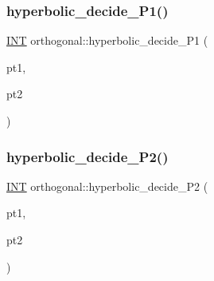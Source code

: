 \mbox{\label{classorthogonal_a5029e837107b4b67481a4a26043f4443}} 
\subsubsection{\texorpdfstring{hyperbolic\+\_\+decide\+\_\+\+P1()}{hyperbolic\_decide\_P1()}}
{\footnotesize\ttfamily \mbox{\hyperlink{galois_8h_a09fddde158a3a20bd2dcadb609de11dc}{I\+NT}} orthogonal\+::hyperbolic\+\_\+decide\+\_\+\+P1 (\begin{DoxyParamCaption}\item[{\mbox{\hyperlink{galois_8h_a09fddde158a3a20bd2dcadb609de11dc}{I\+NT}}}]{pt1,  }\item[{\mbox{\hyperlink{galois_8h_a09fddde158a3a20bd2dcadb609de11dc}{I\+NT}}}]{pt2 }\end{DoxyParamCaption})}

\mbox{\label{classorthogonal_ac4329f8055baf9d40e182af3955687f3}} 
\subsubsection{\texorpdfstring{hyperbolic\+\_\+decide\+\_\+\+P2()}{hyperbolic\_decide\_P2()}}
{\footnotesize\ttfamily \mbox{\hyperlink{galois_8h_a09fddde158a3a20bd2dcadb609de11dc}{I\+NT}} orthogonal\+::hyperbolic\+\_\+decide\+\_\+\+P2 (\begin{DoxyParamCaption}\item[{\mbox{\hyperlink{galois_8h_a09fddde158a3a20bd2dcadb609de11dc}{I\+NT}}}]{pt1,  }\item[{\mbox{\hyperlink{galois_8h_a09fddde158a3a20bd2dcadb609de11dc}{I\+NT}}}]{pt2 }\end{DoxyParamCaption})}

\mbox{\label{classorthogonal_a02d20bb315f3f51e2e5fb4f9479f9f62}} 
